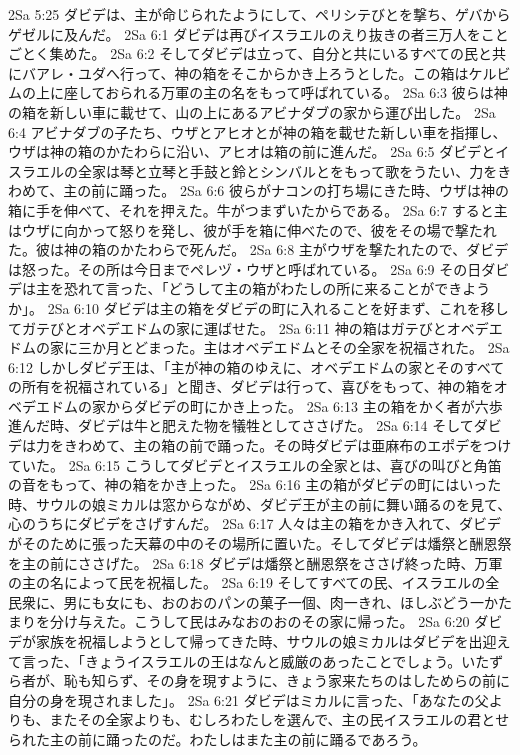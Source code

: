 2Sa 5:25  ダビデは、主が命じられたようにして、ペリシテびとを撃ち、ゲバからゲゼルに及んだ。
2Sa 6:1  ダビデは再びイスラエルのえり抜きの者三万人をことごとく集めた。
2Sa 6:2  そしてダビデは立って、自分と共にいるすべての民と共にバアレ・ユダへ行って、神の箱をそこからかき上ろうとした。この箱はケルビムの上に座しておられる万軍の主の名をもって呼ばれている。
2Sa 6:3  彼らは神の箱を新しい車に載せて、山の上にあるアビナダブの家から運び出した。
2Sa 6:4  アビナダブの子たち、ウザとアヒオとが神の箱を載せた新しい車を指揮し、ウザは神の箱のかたわらに沿い、アヒオは箱の前に進んだ。
2Sa 6:5  ダビデとイスラエルの全家は琴と立琴と手鼓と鈴とシンバルとをもって歌をうたい、力をきわめて、主の前に踊った。
2Sa 6:6  彼らがナコンの打ち場にきた時、ウザは神の箱に手を伸べて、それを押えた。牛がつまずいたからである。
2Sa 6:7  すると主はウザに向かって怒りを発し、彼が手を箱に伸べたので、彼をその場で撃たれた。彼は神の箱のかたわらで死んだ。
2Sa 6:8  主がウザを撃たれたので、ダビデは怒った。その所は今日までペレヅ・ウザと呼ばれている。
2Sa 6:9  その日ダビデは主を恐れて言った、「どうして主の箱がわたしの所に来ることができようか」。
2Sa 6:10  ダビデは主の箱をダビデの町に入れることを好まず、これを移してガテびとオベデエドムの家に運ばせた。
2Sa 6:11  神の箱はガテびとオベデエドムの家に三か月とどまった。主はオベデエドムとその全家を祝福された。
2Sa 6:12  しかしダビデ王は、「主が神の箱のゆえに、オベデエドムの家とそのすべての所有を祝福されている」と聞き、ダビデは行って、喜びをもって、神の箱をオベデエドムの家からダビデの町にかき上った。
2Sa 6:13  主の箱をかく者が六歩進んだ時、ダビデは牛と肥えた物を犠牲としてささげた。
2Sa 6:14  そしてダビデは力をきわめて、主の箱の前で踊った。その時ダビデは亜麻布のエポデをつけていた。
2Sa 6:15  こうしてダビデとイスラエルの全家とは、喜びの叫びと角笛の音をもって、神の箱をかき上った。
2Sa 6:16  主の箱がダビデの町にはいった時、サウルの娘ミカルは窓からながめ、ダビデ王が主の前に舞い踊るのを見て、心のうちにダビデをさげすんだ。
2Sa 6:17  人々は主の箱をかき入れて、ダビデがそのために張った天幕の中のその場所に置いた。そしてダビデは燔祭と酬恩祭を主の前にささげた。
2Sa 6:18  ダビデは燔祭と酬恩祭をささげ終った時、万軍の主の名によって民を祝福した。
2Sa 6:19  そしてすべての民、イスラエルの全民衆に、男にも女にも、おのおのパンの菓子一個、肉一きれ、ほしぶどう一かたまりを分け与えた。こうして民はみなおのおのその家に帰った。
2Sa 6:20  ダビデが家族を祝福しようとして帰ってきた時、サウルの娘ミカルはダビデを出迎えて言った、「きょうイスラエルの王はなんと威厳のあったことでしょう。いたずら者が、恥も知らず、その身を現すように、きょう家来たちのはしためらの前に自分の身を現されました」。
2Sa 6:21  ダビデはミカルに言った、「あなたの父よりも、またその全家よりも、むしろわたしを選んで、主の民イスラエルの君とせられた主の前に踊ったのだ。わたしはまた主の前に踊るであろう。
